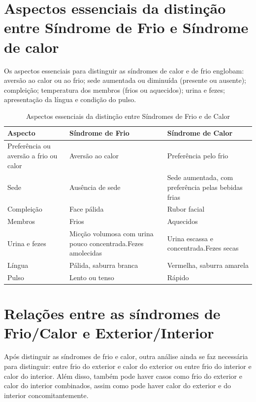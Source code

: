 \documentclass[12pt,oneside,a4paper]{book} %
\begin{document}
\section{Aspectos essenciais da distinção entre Síndrome de Frio e Síndrome de calor}
Os aspectos essenciais para distinguir as síndromes de calor e de frio englobam: aversão ao calor ou ao frio; sede aumentada ou diminuída (presente ou ausente); compleição; temperatura dos membros (frios ou aquecidos); urina e fezes; apresentação da língua e condição do pulso.
\begin{table}[ht]
	
	\centering
	{\renewcommand\arraystretch{1.25}
		\caption{Aspectos essenciais da distinção entre Síndromes de Frio e de Calor}}
	

		\begin{tabular}{l p{5.5cm} p{5.5cm}}
			
			\hline
			
			Aspecto & 
			Síndrome de Frio &
			Síndrome de Calor				
			\\ \hline \hline
			  
			Preferência ou aversão a frio ou calor &
			Aversão ao calor &
			Preferência pelo frio
			\\  
			  
			Sede &
			Ausência de sede &
			Sede aumentada, com preferência pelas bebidas frias
			\\  
			  
			Compleição &
			Face pálida &
			Rubor facial
			\\  
			  
			Membros &
			Frios &
			Aquecidos
			\\  
			  
			Urina e fezes &
			Micção volumosa com urina pouco concentrada.Fezes amolecidas &
			Urina escassa e concentrada.Fezes secas
			\\  
			  
			Língua &
			Pálida, saburra branca &
			Vermelha, saburra amarela
			\\  
			  
			Pulso &
			Lento ou tenso &
			Rápido
			\\  
			\hline
			
	\end{tabular}
	
	
\end{table} 

\section{Relações entre as síndromes de Frio/Calor e Exterior/Interior}
Após distinguir as síndromes de frio e calor, outra análise ainda se faz necessária para distinguir: entre frio do exterior e calor do exterior ou entre frio do interior e calor do interior.
Além disso, também pode haver casos como frio do exterior e calor do interior combinados, assim como pode haver calor do exterior e do interior concomitantemente.
\end{document}
